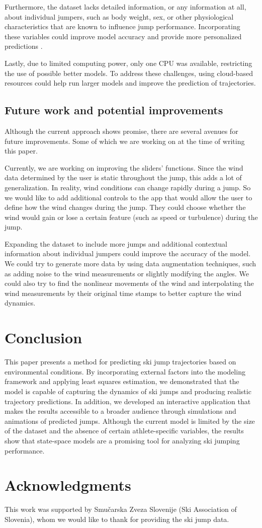 \documentclass[sigconf]{acmart}
\begin{document}
Furthermore, the dataset lacks detailed information, or any information at all,
about individual jumpers, such as body weight, sex, or other physiological
characteristics that are known to influence jump performance. Incorporating
these variables could improve model accuracy and provide more personalized
predictions \cite{mueller2008}.

Lastly, due to limited computing power, only one CPU was available, restricting
the use of possible better models. To address these challenges, using
cloud-based resources could help run larger models and improve the prediction
of trajectories.

\subsection{Future work and potential improvements}
Although the current approach shows promise, there are several avenues for
future improvements. Some of which we are working on at the time of writing
this paper.

Currently, we are working on improving the sliders’ functions. Since the wind
data determined by the user is static throughout the jump, this adds a lot of
generalization. In reality, wind conditions can change rapidly during a jump.
So we would like to add additional controls to the app that would allow the
user to define how the wind changes during the jump. They could choose whether
the wind would gain or lose a certain feature (such as speed or turbulence)
during the jump.

Expanding the dataset to include more jumps and additional contextual
information about individual jumpers could improve the accuracy of the model.
We could try to generate more data by using data augmentation techniques, such
as adding noise to the wind measurements or slightly modifying the angles. We
could also try to find the nonlinear movements of the wind and interpolating
the wind measurements by their original time stamps to better capture the wind
dynamics.

\section{Conclusion}
This paper presents a method for predicting ski jump trajectories based on
environmental conditions. By incorporating external factors into the modeling
framework and applying least squares estimation, we demonstrated that the model
is capable of capturing the dynamics of ski jumps and producing realistic
trajectory predictions. In addition, we developed an interactive application
that makes the results accessible to a broader audience through simulations and
animations of predicted jumps. Although the current model is limited by the size
of the dataset and the absence of certain athlete-specific variables, the
results show that state-space models are a promising tool for analyzing ski
jumping performance.

\section{Acknowledgments}
This work was supported by Smučarska Zveza Slovenije (Ski Association of
Slovenia), whom we would like to thank for providing the ski jump data.



\end{document}
